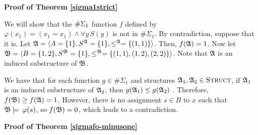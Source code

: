 \textbf{Proof of Theorem \ref{sigma1strict}}

We will show that the $\#\Sigma_{1}$ function $f$ defined by $\varphi(x_1) = (x_1 = x_1) \wedge \forall y \, S(y)$ is not in $\#\Sigma_1$. By contradiction, suppose that it is. Let $\mathfrak{A} = \langle A =\{1\},S^{\mathfrak{A}} = \{1\},\leq^{\mathfrak{A}}=\{(1,1)\} \rangle$. Then, $f(\mathfrak{A}) = 1$. Now let ${\frak B} = \langle B =\{1,2\},S^{\frak B} = \{1\},\leq^{\frak B}=\{(1,1),(1,2),(2,2)\} \rangle$. Note that $\mathfrak{A}$ is an induced substructure of ${\frak B}$.

We have that for each function $g \in \#\Sigma_1$ and structures $\mathfrak{A}_1,\mathfrak{A}_2\in\text{\sc Struct}$, if $\mathfrak{A}_1$ is an induced substructure of $\mathfrak{A}_2$, then $g(\mathfrak{A}_1) \leq g(\mathfrak{A}_2)$ \cite{DBLP:journals/jcss/SalujaST95}. Therefore, $f({\frak B}) \geq f(\mathfrak{A}) = 1$. However, there is no assignment $s\in B$ to $x$ such that ${\frak B}\models\:\varphi(s)$, so $f({\frak B}) = 0$, which leads to a contradiction.
	
\textbf{Proof of Theorem \ref{sigmafo-minusone}}

